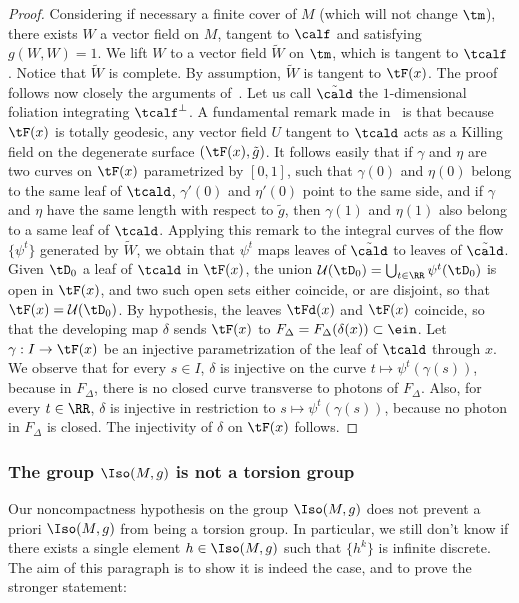 \begin{proof}
Considering if necessary a finite cover of $M$ (which will not change $\tm$), there exists $W$ a vector field on $M$, tangent to $\calf$ and satisfying $g(W,W)=1$. We lift $W$ to a vector field $\tilde{W}$ on $\tm$, which is tangent to $\tcalf$. Notice that $\tilde{W}$ is complete. By assumption, $\tilde{W}$ is tangent to $\tF(x)$. The proof follows now closely the arguments of~\cite[Proposition~6.5]{zeghibflot}. Let us call $\tilde{\cald}$ the $1$-dimensional foliation integrating $\tcalf^{\perp}$. A fundamental remark made in~\cite[Proposition~2]{zeghibfoliation} is that because $\tF(x)$ is totally geodesic, any vector field $U$ tangent to $\tcald$ acts as a Killing field on the degenerate surface $(\tF(x),\tilde{g})$. It follows easily that if $\gamma$ and $\eta$ are two curves on $\tF(x)$ parametrized by $[0,1]$, such that $\gamma(0)$ and $\eta(0)$ belong to the same leaf of $\tcald$, $\gamma'(0)$ and $\eta'(0)$ point to the same side, and if $\gamma$ and $\eta$ have the same length with respect to $\tilde{g}$, then $\gamma(1)$ and $\eta(1)$ also belong to a same leaf of $\tcald$. Applying this remark to the integral curves of the flow $\{ \psi^t \}$ generated by $\tilde{W}$, we obtain that $\psi^t$ maps leaves of $\tilde{\cald}$ to leaves of $\tilde{\cald}$. Given $\tD_0$ a leaf of $\tcald$ in $\tF(x)$, the union ${\mathcal U}(\tD_0)=\bigcup_{t \in \RR} \psi^t(\tD_0)$ is open in $\tF(x)$, and two such open sets either coincide, or are disjoint, so that $\tF(x)={\mathcal U}(\tD_0)$. By hypothesis, the leaves $ \tFd(x)$ and $\tF(x)$ coincide, so that the developing map $\delta$ sends $ \tF(x)$ to $F_{\Delta}=F_{\Delta}(\delta(x)) \subset \ein$. Let $\gamma: I \to \tF(x)$ be an injective parametrization of the leaf of $\tcald$ through $x$. We observe that for every $s \in I$, $\delta$ is injective on the curve $t \mapsto \psi^t(\gamma(s))$, because in $F_{\Delta}$, there is no closed curve transverse to photons of $F_{\Delta}$. Also, for every $t \in \RR$, $\delta$ is injective in restriction to $s \mapsto \psi^t(\gamma(s))$, because no photon in $F_{\Delta}$ is closed. The injectivity of $\delta$ on $\tF(x)$ follows.
\end{proof}

\subsubsection{The group \texorpdfstring{$\Iso(M,g)$}{Iso(M,g)} is not a torsion group}\label{sec.notorsion}
Our noncompactness hypothesis on the group $\Iso(M,g)$ does not prevent a priori $\Iso(M,g)$ from being a torsion group. In particular, we still don't know if there exists a single element $h \in \Iso(M,g)$ such that $\{ h^k \}$ is infinite discrete. The aim of this paragraph is to show it is indeed the case, and to prove the stronger statement:

